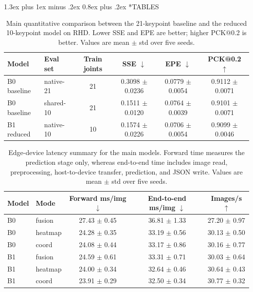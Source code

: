 \documentclass[10pt,letterpaper]{article}
\makeatletter
\renewcommand\section{\@startsection{section}{1}{\z@}%
  {1.3ex plus 1ex minus .2ex}%
  {0.8ex plus .2ex}%
  {\centering\normalfont\small\scshape}}
\makeatother
\begin{document}
\clearpage
\onecolumn
\section*{TABLES}

\begin{table}[H]
\centering
\footnotesize
\caption{Main quantitative comparison between the 21-keypoint baseline and the reduced 10-keypoint model on RHD. Lower SSE and EPE are better; higher PCK@0.2 is better. Values are mean $\pm$ std over five seeds.}
\label{tab:main_accuracy}
\begin{tabular}{llcccc}
\toprule
Model & Eval set & Train joints & SSE $\downarrow$ & EPE $\downarrow$ & PCK@0.2 $\uparrow$ \\
\midrule
B0 baseline & native-21 & 21 & 0.3098 $\pm$ 0.0236 & 0.0779 $\pm$ 0.0054 & 0.9112 $\pm$ 0.0071 \\
B0 baseline & shared-10 & 21 & 0.1511 $\pm$ 0.0120 & 0.0764 $\pm$ 0.0039 & 0.9101 $\pm$ 0.0071 \\
B1 reduced & native-10 & 10 & 0.1574 $\pm$ 0.0226 & 0.0706 $\pm$ 0.0054 & 0.9099 $\pm$ 0.0046 \\
\bottomrule
\end{tabular}
\end{table}

\begin{table}[H]
\centering
\footnotesize
\caption{Edge-device latency summary for the main models. Forward time measures the prediction stage only, whereas end-to-end time includes image read, preprocessing, host-to-device transfer, prediction, and JSON write. Values are mean $\pm$ std over five seeds.}
\label{tab:latency}
\begin{tabular}{llccc}
\toprule
Model & Mode & Forward ms/img $\downarrow$ & End-to-end ms/img $\downarrow$ & Images/s $\uparrow$ \\
\midrule
B0 & fusion & 27.43 $\pm$ 0.45 & 36.81 $\pm$ 1.33 & 27.20 $\pm$ 0.97 \\
B0 & heatmap & 24.28 $\pm$ 0.35 & 33.19 $\pm$ 0.56 & 30.13 $\pm$ 0.50 \\
B0 & coord & 24.08 $\pm$ 0.44 & 33.17 $\pm$ 0.86 & 30.16 $\pm$ 0.77 \\
B1 & fusion & 24.59 $\pm$ 0.61 & 33.31 $\pm$ 0.71 & 30.03 $\pm$ 0.64 \\
B1 & heatmap & 24.00 $\pm$ 0.34 & 32.64 $\pm$ 0.46 & 30.64 $\pm$ 0.43 \\
B1 & coord & 23.91 $\pm$ 0.29 & 32.50 $\pm$ 0.34 & 30.77 $\pm$ 0.32 \\
\bottomrule
\end{tabular}
\end{table}
\end{document}
